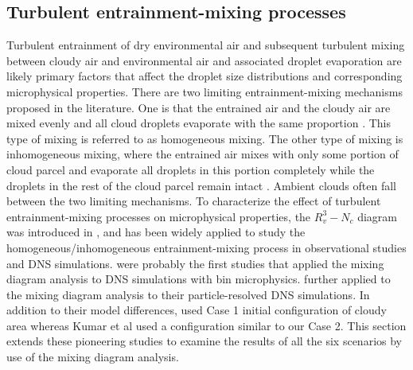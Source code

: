 \subsection{Turbulent entrainment-mixing processes}
Turbulent entrainment of dry environmental air and subsequent turbulent mixing between cloudy air and environmental air and associated droplet evaporation are likely primary factors that affect the droplet size distributions and corresponding microphysical properties. There are two limiting entrainment-mixing mechanisms proposed in the literature. One is that the entrained air and the cloudy air are mixed evenly and all cloud droplets evaporate with the same proportion \cite{Warner1973}. This type of mixing is referred to as homogeneous mixing. The other type of mixing is inhomogeneous mixing, where the entrained air mixes with only some portion of cloud parcel and evaporate all droplets in this portion completely while the droplets in the rest of the cloud parcel remain intact \cite{Baker1980}. Ambient clouds often fall between the two limiting mechanisms. To characterize the effect of turbulent entrainment-mixing processes on microphysical properties, the $R_v^3-N_c$ diagram was introduced in \cite{Burnet2007Observational}, and has been widely applied to study the homogeneous/inhomogeneous entrainment-mixing process in observational studies and DNS simulations. \cite{And04, And06, And09} were probably the first studies that applied the mixing diagram analysis to DNS simulations with bin microphysics. \cite{Kumar14} further applied to the mixing diagram analysis to their particle-resolved DNS simulations. In addition to their model differences,  \cite{And04, And06, And09} used Case 1 initial configuration of cloudy area whereas Kumar et al used a configuration similar to our Case 2. This section extends these pioneering studies to examine the results of all the six scenarios by use of the mixing diagram analysis.

